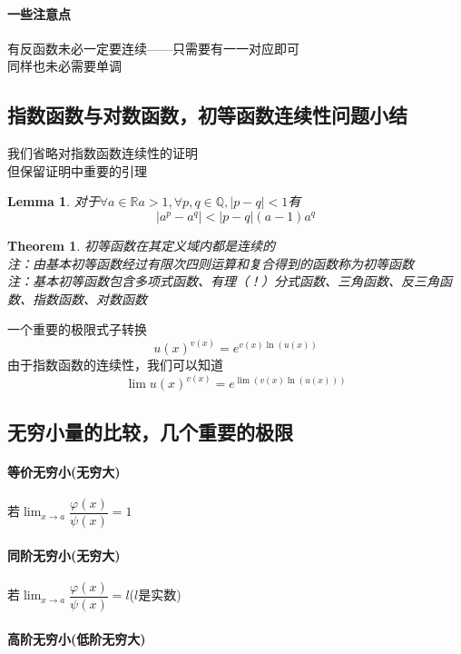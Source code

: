 \documentclass[11pt,hyperref,a4paper,UTF8]{ctexart}
\newtheorem{theorem}{Theorem}[subsection]
\newtheorem{lemma}{Lemma}[subsection]
\begin{document}
\begin{CJK}{UTF8}{gkai}
\paragraph{一些注意点\\}
有反函数未必一定要连续——只需要有一一对应即可\\
同样也未必需要单调\\
\subsection{指数函数与对数函数，初等函数连续性问题小结}

我们省略对指数函数连续性的证明\\
但保留证明中重要的引理\\
\begin{lemma}
对于$\forall a\in \mathbb{R} a>1,\forall p,q\in \mathbb{Q}, |p-q| < 1$有
\[|a^p-a^q|<|p-q|(a-1)a^q\]
\end{lemma}
\begin{theorem}

初等函数在其定义域内都是连续的\\
注：由基本初等函数经过有限次四则运算和复合得到的函数称为初等函数\\
注：基本初等函数包含多项式函数、有理（！）分式函数、三角函数、反三角函数、指数函数、对数函数\\
\end{theorem}
一个重要的极限式子转换
\[u(x)^{v(x)}=e^{v(x)\ln(u(x))}\]
由于指数函数的连续性，我们可以知道
\[\lim u(x)^{v(x)}=e^{\lim(v(x)\ln(u(x)))}\]

\subsection{无穷小量的比较，几个重要的极限}

\paragraph{等价无穷小(无穷大)\\}
若$\lim_{x\to a}\dfrac{\varphi(x)}{\psi(x)}=1$\\

\paragraph{同阶无穷小(无穷大)\\}
若$\lim_{x\to a}\dfrac{\varphi(x)}{\psi(x)}=l$($l$是实数)\\
\paragraph{高阶无穷小(低阶无穷大)\\}


\end{CJK}
\end{document}
